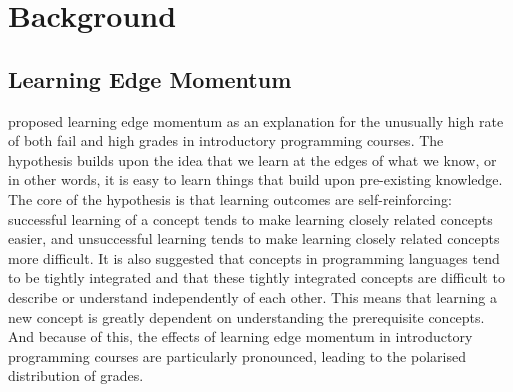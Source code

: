 \documentclass[12pt]{article}
\theoremstyle{grammarstyle}
\begin{document}

\section{Background} \label{sec:background}
\subsection{Learning Edge Momentum}
\cite{robins2010learning} proposed learning edge momentum as an explanation for the unusually high rate of both fail and high grades in introductory programming courses. The hypothesis builds upon the idea that we learn at the edges of what we know, or in other words, it is easy to learn things that build upon pre-existing knowledge. The core of the hypothesis is that learning outcomes are self-reinforcing: successful learning of a concept tends to make learning closely related concepts easier, and unsuccessful learning tends to make learning closely related concepts more difficult. It is also suggested that concepts in programming languages tend to be tightly integrated and that these tightly integrated concepts are difficult to describe or understand independently of each other. This means that learning a new concept is greatly dependent on understanding the prerequisite concepts. And because of this, the effects of learning edge momentum in introductory programming courses are particularly pronounced, leading to the polarised distribution of grades.
\end{document}
